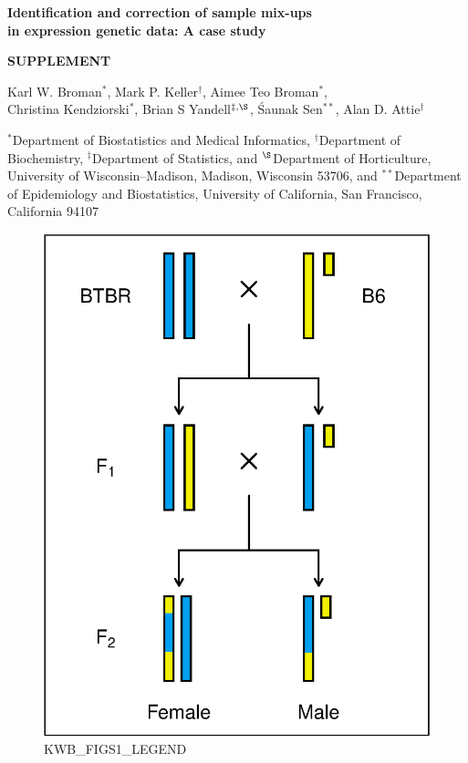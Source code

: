 \documentclass[letterpaper,twoside]{article}
\begin{document}
\vspace*{8mm}
\begin{center}

\textbf{\Large Identification and correction of sample mix-ups \\[14pt]
in expression genetic data: A case study}


\bigskip \bigskip \bigskip \bigskip

\textbf{\Large SUPPLEMENT}

\bigskip \bigskip
\bigskip \bigskip


{\large Karl W. Broman$^*$,
Mark P. Keller$^{\dagger}$,
Aimee Teo Broman$^{*}$, \\[8pt]
Christina Kendziorski$^{*}$,
Brian S Yandell$^{\ddagger, \S}$,
\'Saunak Sen$^{**}$,
Alan D. Attie$^{\dagger}$}

\bigskip \bigskip

$^{*}$Department of Biostatistics and Medical Informatics,
$^{\dagger}$Department of Biochemistry,
$^{\ddagger}$Department of Statistics,
and $^{\S}$Department of Horticulture,
University of Wisconsin--Madison, Madison, Wisconsin
53706, and
$^{**}$Department of Epidemiology and Biostatistics, University
of California, San Francisco, California 94107
\end{center}




\clearpage

\begin{figure}[p]
\centerline{\includegraphics{SuppFigs/figS1.eps}}

\caption{KWB_FIGS1_LEGEND}
\end{figure}
\end{document}
